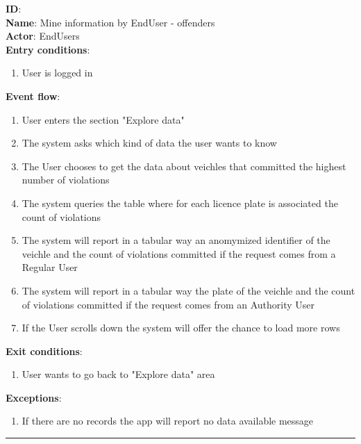 \begin{enumerate}
\begin{itemize}
    \textbf{ID}:  \\
    \textbf{Name}: Mine information by EndUser - offenders \\
    \textbf{Actor}: EndUsers   \\
    \textbf{Entry conditions}:
    \begin{enumerate}
      \item{User is logged in}
    \end{enumerate}
    \textbf{Event flow}:
    \begin{enumerate}
      \item{User enters the section "Explore data"}
      \item{The system asks which kind of data the user wants to know}
      \item{The User chooses to get the data about veichles that committed the highest number of violations}
      \item{The system queries the table where for each licence plate is associated the count of violations }
      \item{The system will report in a tabular way an anomymized identifier of the veichle and the count of violations committed if the request comes from a Regular User}
      \item{The system will report in a tabular way the plate of the veichle and the count of violations committed if the request comes from an Authority User}
      \item{If the User scrolls down the system will offer the chance to load more rows}
    \end{enumerate}
    \textbf{Exit conditions}:
    \begin{enumerate}
      \item{User wants to go back to "Explore data" area}
    \end{enumerate}
    \textbf{Exceptions}:
    \begin{enumerate}
      \item{If there are no records the app will report no data available message}
    \end{enumerate}
    \rule{\linewidth}{0.4pt}



\end{itemize}
\end{enumerate}
